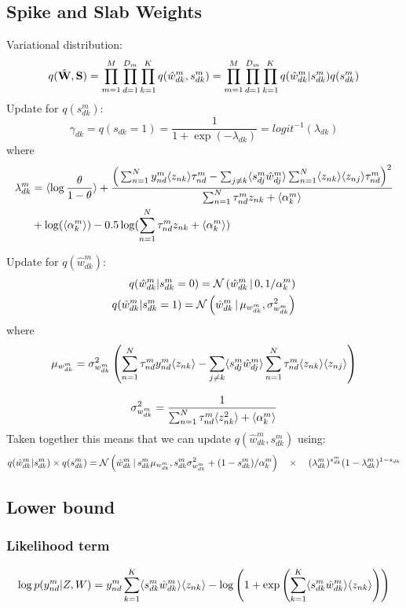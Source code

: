 \documentclass[10pt, a4paper,openany]{report}
\begin{document}
\subsection*{Spike and Slab Weights}
Variational distribution:
\[
q(\hat{{\bf W}},{\bf S}) = \prod_{m=1}^{M} \prod_{d=1}^{D_m} \prod_{k=1}^{K} q(\hat{w}_{dk}^m,s_{dk}^m) = \prod_{m=1}^{M} \prod_{d=1}^{D_m} \prod_{k=1}^{K} q(\hat{w}_{dk}^m|s_{dk}^m)q(s_{dk}^m)
\]
Update for $q(s_{dk}^m)$:
\[
\gamma_{dk} = q(s_{dk}=1) = \frac{1}{1+\exp(-\lambda_{dk})} =logit^{-1}(\lambda_{dk})
\]
where
\begin{align*}
\lambda_{dk}^m &= \langle \log\frac{\theta}{1-\theta} \rangle + \frac{ \Big( \sum_{n=1}^{N} y_{nd}^m \langle z_{nk} \rangle \tau_{nd}^m- \sum_{j \neq k} \langle s_{dj}^m\hat{w}_{dj}^m\rangle \sum_{n=1}^{N} \langle z_{nk} \rangle \langle z_{nj} \rangle \tau_{nd}^m\Big)^2}{\sum_{n=1}^N \tau_{nd}^m  z_{nk} +\langle\alpha_k^m\rangle}\\
 &+ \log(\langle\alpha_k^m\rangle) - 0.5 \log(\sum_{n=1}^N \tau_{nd}^m  z_{nk} +\langle\alpha_k^m\rangle)
\end{align*}


Update for $q(\hat{w}_{dk}^m)$:
\begin{align*}
q(\hat{w}_{dk}^m|s_{dk}^m=0) = \mathcal{N}\left(\hat{w}_{dk}^m \,|\, 0,1/\alpha_k^m\right) \\
q(\hat{w}_{dk}^m|s_{dk}^m=1) = \mathcal{N}\left(\hat{w}_{dk}^m \,|\, \mu_{w_{dk}^m},\sigma_{w_{dk}^m}^2\right)
\end{align*}
where
\[
\mu_{w_{dk}^m} = \sigma^2_{w_{dk}^m} \left(\sum_{n=1}^N  \tau_{nd}^m  y_{nd}^m \langle z_{nk} \rangle -  \sum_{j \neq k} \langle s_{dj}^m\hat{w}_{dj}^m \rangle\sum_{n=1}^N  \tau_{nd}^m \langle z_{nk} \rangle \langle z_{nj} \rangle \right)
\]

\[
\sigma^2_{w_{dk}^m} = \frac{1 } { \sum_{n=1}^{N} \tau_{nd}^m \langle z_{nk}^2 \rangle + \langle\alpha_k^m\rangle}
\]
Taken together this means that we can update $q(\hat{w}_{dk}^m,s_{dk}^m)$ using:
\[
q(\hat{w}_{dk}^m|s_{dk}^m) \times q(s_{dk}^m) = \mathcal{N}\left( \hat{w}_{dk}^m  \,|\,  s_{dk}^m \mu_{w_{dk}^m}, s_{dk}^m\sigma_{w_{dk}^m}^2 + (1-s_{dk}^m)/\alpha_k^m\right) \quad \times \quad (\lambda_{dk}^m)^{s_{dk}^m} (1-\lambda_{dk}^m)^{1-s_{dk}}
\]


\subsection{Lower bound}

\subsubsection{Likelihood term}

\[
\log p(y^m_{nd}|Z,W)=y^m_{nd}\sum_{k=1}^{K}\langle s_{dk}^m \hat{w}_{dk}^m \rangle \langle z_{nk} \rangle - \log\left(1+\exp\left(\sum_{k=1}^{K}\langle s_{dk}^m \hat{w}_{dk}^m \rangle \langle z_{nk}\rangle\right)\right)
\]
\end{document}
